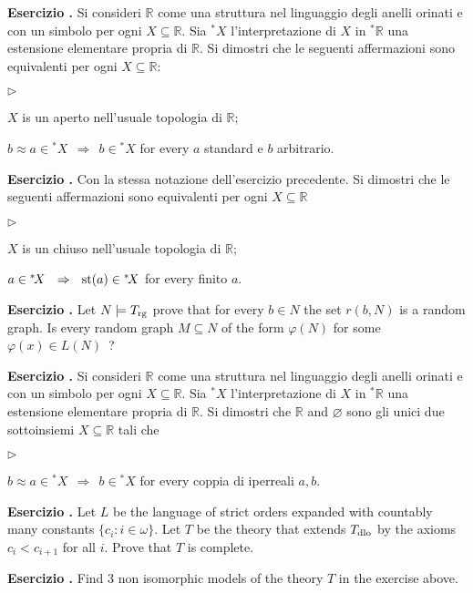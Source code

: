 \documentclass[10pt]{article}
\def\phi{\varphi}
\def\RR{\mathds R}
\def\0{\varnothing}
\def\IMP{\Rightarrow}
\newcommand{\labella}[1]{{\sf\footnotesize #1}\hfill}
\renewenvironment{itemize}
  {\begin{list}{$\triangleright$}{%
   \setlength{\parskip}{0mm}
   \setlength{\topsep}{0mm}
   \setlength{\rightmargin}{0mm}
   \setlength{\listparindent}{0mm}
   \setlength{\itemindent}{0mm}
   \setlength{\labelwidth}{3ex}
   \setlength{\itemsep}{0mm}
   \setlength{\parsep}{0mm}
   \setlength{\partopsep}{0mm}
   \setlength{\labelsep}{1ex}
   \setlength{\leftmargin}{\labelwidth+\labelsep}
   \let\makelabel\labella}}{%
   \end{list}}
\newcounter{ex}
\newenvironment{exercise}{\bigskip\addtocounter{ex}{1}\textbf{Esercizio \theex.\quad}}{}
\begin{document}
\clearpage%
\setcounter{ex}{0}


\begin{exercise}
Si consideri $\RR$ come una struttura nel linguaggio degli anelli orinati e con un simbolo per ogni $X\subseteq\RR$. Sia ${}^*\!X$ l'interpretazione di $X$ in ${}^*\!\RR$ una estensione elementare propria di $\RR$. Si dimostri che le seguenti affermazioni sono equivalenti per ogni $X\subseteq\RR$:\nobreak
\begin{itemize}
\item[1.]  $X$ is un aperto nell'usuale topologia di $\RR$;
\item[2.]  $b\approx a\in{}^*\!X \ \ \IMP\ \ b\in{}^*\!X$ for every $a$ standard e $b$ arbitrario.
\end{itemize}
\end{exercise}

\begin{exercise}
Con la stessa notazione dell'esercizio precedente. Si dimostri che le seguenti affermazioni sono equivalenti per ogni $X\subseteq\RR$\nobreak
\begin{itemize}
\item[1.]  $X$ is un chiuso nell'usuale topologia di $\RR$;
\item[2.]  $a\in{}^*\!X \ \ \IMP\ \ {\rm st}(a)\in{}^*\!X$ for every finito $a$.
\end{itemize}
\end{exercise}

\begin{exercise}
Let $N\models T_{\rm rg}$ prove that for every $b\in N$ the set $r(b,N)$ is a random graph.
Is every random graph $M\subseteq N$ of the form $\phi(N)$ for some $\phi(x)\in L(N)$~?
\end{exercise}

\clearpage%
\setcounter{ex}{0}

\begin{exercise}
Si consideri $\RR$ come una struttura nel linguaggio degli anelli orinati e con un simbolo per ogni $X\subseteq\RR$. Sia ${}^*\!X$ l'interpretazione di $X$ in ${}^*\!\RR$ una estensione elementare propria di $\RR$. Si dimostri che $\RR$ and $\0$ sono gli unici due sottoinsiemi $X\subseteq\RR$ tali che\nobreak
\begin{itemize}
\item[]  $b\approx a\in{}^*\!X \ \ \IMP\ \ b\in{}^*\!X$ for every coppia di iperreali $a, b$.
\end{itemize}
\end{exercise}

\begin{exercise}
Let $L$ be the language of strict orders expanded with countably many constants $\big\{c_i: i\in\omega\big\}$.
Let $T$ be the theory that extends $T_{\rm dlo}$ by the axioms $c_i<c_{i+1}$ for all $i$.
Prove that $T$ is complete.
\end{exercise} 

\begin{exercise}
Find 3 non isomorphic models of the theory $T$ in the exercise above.
\end{exercise}
\end{document}
